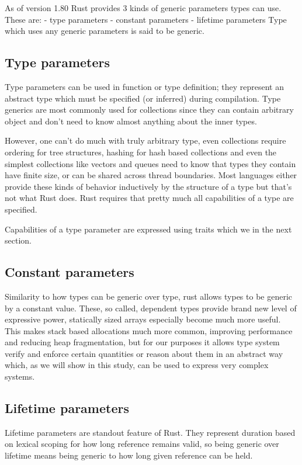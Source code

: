 As of version 1.80 Rust provides 3 kinds of generic parameters types can use. 
These are:
- type parameters
- constant parameters
- lifetime parameters
Type which uses any generic parameters is said to be generic.

\subsection{Type parameters}

Type parameters can be used in function or type definition; they represent an abstract type which must be specified (or inferred) during compilation.
Type generics are most commonly used for collections since they can contain arbitrary object and don't need to know almost anything about the inner types.

However, one can't do much with truly arbitrary type, even collections require ordering for tree structures, hashing for hash based collections and even the simplest collections
like vectors and queues need to know that types they contain have finite size, or can be shared across thread boundaries. Most languages either provide these kinds of behavior
inductively by the structure of a type but that's not what Rust does. Rust requires that pretty much all capabilities of a type are specified.

Capabilities of a type parameter are expressed using traits which we in the next section.

\subsection{Constant parameters}

Similarity to how types can be generic over type, rust allows types to be generic by a constant value. These, so called, dependent types
provide brand new level of expressive power, statically sized arrays especially become much more useful. This makes stack based allocations much more common,
improving performance and reducing heap fragmentation, but for our purposes it allows type system verify and enforce certain quantities or reason about them in an abstract 
way which, as we will show in this study, can be used to express very complex systems.

\subsection{Lifetime parameters}

Lifetime parameters are standout feature of Rust. They represent duration based on lexical scoping for how long reference remains valid, so being generic over lifetime means being generic
to how long given reference can be held.

